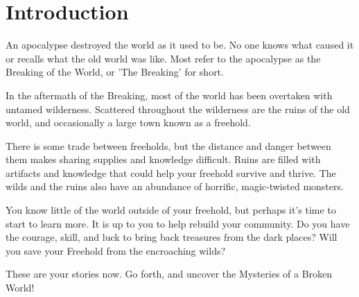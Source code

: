 \chapter{Introduction}

\begin{multicols}{2}

An apocalypse destroyed the world as it used to be. No one knows what caused it or recalls what the old world was like. Most refer to the apocalypse as the Breaking of the World, or 'The Breaking' for short.

In the aftermath of the Breaking, most of the world has been overtaken with untamed wilderness. Scattered throughout the wilderness are the ruins of the old world, and occasionally a large town known as a freehold.

There is some trade between freeholds, but the distance and danger between them makes sharing supplies and knowledge difficult. Ruins are filled with artifacts and knowledge that could help your freehold survive and thrive. The wilds and the ruins also have an abundance of horrific, magic-twisted monsters.

You know little of the world outside of your freehold, but perhaps it’s time to start to learn more. It is up to you to help rebuild your community. Do you have the courage, skill, and luck to bring back treasures from the dark places? Will you save your Freehold from the encroaching wilds?

These are your stories now. Go forth, and uncover the Mysteries of a Broken World!

\end{multicols}
